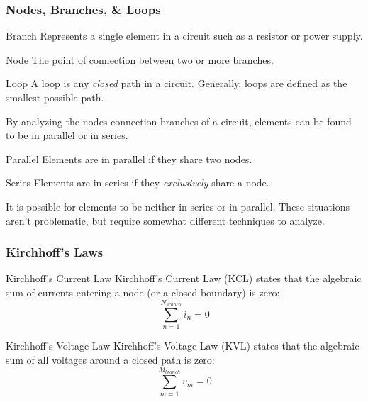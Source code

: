 \documentclass[12pt]{article}
\begin{document}
\subsubsection{Nodes, Branches, & Loops}
\label{sssec:nodesBranchesLoops}

\begin{definition}{Branch}
  Represents a single element in a circuit such as a resistor or power supply.
\end{definition}

\begin{definition}{Node}
  The point of connection between two or more branches.
\end{definition}

\begin{definition}{Loop}
  A loop is any \textit{closed} path in a circuit. Generally, loops are defined as the smallest possible path.
\end{definition}

By analyzing the nodes connection branches of a circuit, elements can be found to be in parallel or in series.

\begin{definition}{Parallel}
  Elements are in parallel if they share two nodes.
\end{definition}

\begin{definition}{Series}
  Elements are in series if they \textit{exclusively} share a node.
\end{definition}

It is possible for elements to be neither in series or in parallel. These situations aren't problematic, but require somewhat different techniques to analyze.

\subsubsection{Kirchhoff's Laws}
\label{sssec:kirchoffsLaws}

\begin{definition}{Kirchhoff's Current Law}
  Kirchhoff's Current Law (KCL) states that the algebraic sum of currents entering a node (or a closed boundary) is zero:
  \begin{equation*}
    \sum_{n=1}^{N_{branch}} i_n = 0
  \end{equation*}
\end{definition}

\begin{definition}{Kirchhoff's Voltage Law}
  Kirchhoff's Voltage Law (KVL) states that the algebraic sum of all voltages around a closed path is zero:
  \begin{equation*}
    \sum_{m=1}^{M_{branch}} v_m = 0
  \end{equation*}
\end{definition}
\end{document}
